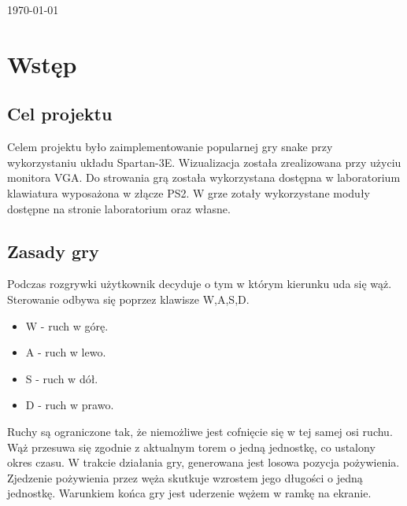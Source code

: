 \documentclass[12pt]{article}
\begin{document}
\begin{titlepage}

\vspace*{\fill}


{\large \today}\\[2cm] %

\end{titlepage}
\newpage
\tableofcontents
\clearpage
\section{Wstęp}
\subsection{Cel projektu}
Celem projektu było zaimplementowanie popularnej gry snake przy wykorzystaniu 
układu Spartan-3E. Wizualizacja została zrealizowana przy użyciu monitora VGA. 
Do strowania grą została wykorzystana dostępna w laboratorium klawiatura wyposażona w 
złącze PS2. W grze zotały wykorzystane moduły dostępne na stronie laboratorium oraz własne.
\subsection{Zasady gry}
Podczas rozgrywki użytkownik decyduje o tym w którym kierunku uda się wąż. 
Sterowanie odbywa się poprzez klawisze W,A,S,D.
\begin{itemize}
\item W - ruch w górę.
\item A - ruch w lewo.
\item S - ruch w dół.
\item D - ruch w prawo.
\end{itemize}
Ruchy są ograniczone tak, że niemożliwe jest cofnięcie się w tej samej osi ruchu.
Wąż przesuwa się zgodnie z aktualnym torem o jedną jednostkę, co ustalony okres czasu.
W trakcie działania gry, generowana jest losowa pozycja pożywienia. 
Zjedzenie pożywienia przez węża skutkuje wzrostem jego długości o jedną jednostkę.
Warunkiem końca gry jest uderzenie wężem w ramkę na ekranie.
\end{document}
